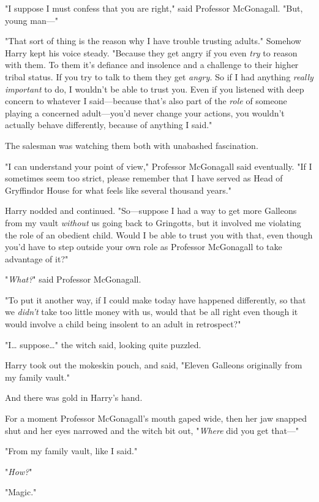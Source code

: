 "I suppose I must confess that you are right," said Professor McGonagall. "But,
young man---"

"That sort of thing is the reason why I have trouble trusting adults." Somehow
Harry kept his voice steady. "Because they get angry if you even \emph{try} to
reason with them. To them it's defiance and insolence and a challenge to their
higher tribal status. If you try to talk to them they get \emph{angry.} So if I
had anything \emph{really important} to do, I wouldn't be able to trust you.
Even if you listened with deep concern to whatever I said---because that's also
part of the \emph{role} of someone playing a concerned adult---you'd never
change your actions, you wouldn't actually behave differently, because of
anything I said."

The salesman was watching them both with unabashed fascination.

"I can understand your point of view," Professor McGonagall said eventually.
"If I sometimes seem too strict, please remember that I have served as Head of
Gryffindor House for what feels like several thousand years."

Harry nodded and continued. "So---suppose I had a way to get more Galleons from
my vault \emph{without} us going back to Gringotts, but it involved me
violating the role of an obedient child. Would I be able to trust you with
that, even though you'd have to step outside your own role as Professor
McGonagall to take advantage of it?"

"\emph{What?}" said Professor McGonagall.

"To put it another way, if I could make today have happened differently, so
that we \emph{didn't} take too little money with us, would that be all right
even though it would involve a child being insolent to an adult in retrospect?"

"I{\ldots} suppose{\ldots}" the witch said, looking quite puzzled.

Harry took out the mokeskin pouch, and said, "Eleven Galleons originally from
my family vault."

And there was gold in Harry's hand.

For a moment Professor McGonagall's mouth gaped wide, then her jaw snapped shut
and her eyes narrowed and the witch bit out, "\emph{Where} did you get that---"

"From my family vault, like I said."

"\emph{How?}"

"Magic."

